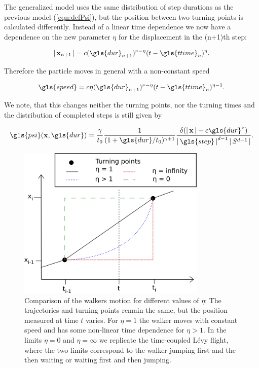 The generalized model uses the same distribution of step durations as the previous model (\ref{eqn:defPsi}), but the position between two turning points is calculated differently. Instead of a linear time dependence we now have a dependence on the new parameter $\eta$ for the displacement in the (n+1)th step:

\begin{align}
\abs{\ve{x}_{n+1}} = c (\gls{dur}_{n+1})^{\nu-\eta} (t-\gls{ttime}_n)^{\eta} .
\end{align}

Therefore the particle moves in general with a non-constant speed  

\begin{align}
\gls{speed} = c \eta (\gls{dur}_{n+1})^{\nu-\eta} (t-\gls{ttime}_n)^{\eta-1} .
\end{align}

We note, that this changes neither the turning points, nor the turning times and the distribution of completed steps is still given by 

\begin{align}
\gls{psi}(\ve{x}, \gls{dur} ) = \frac{\gamma}{t_0} \frac{1}{(1+\gls{dur}/t_0)^{\gamma+1}}  \frac{\delta(\abs{\ve{x}} - c \gls{dur}^{\nu}) }{\abs{\gls{step}}^{d-1} \abs{S^{d-1}}}  .
\end{align}


\begin{figure}
\begin{center}
\includegraphics[width=90mm]{pics/turningPoints.png}
\caption{Comparison of the walkers motion for different values of $\eta$: The trajectories and turning points remain the same, but the position measured at time $t$ varies. For $\eta = 1$ the walker moves with constant speed and has some non-linear time dependence for $\eta > 1$. In the limits $\eta = 0$ and $\eta = \infty$ we replicate the time-coupled L\'evy flight, where the two limits correspond to the walker jumping first and the then waiting or waiting first and then jumping. 
\label{fig:turningPoints}}
\end{center}
\end{figure}

